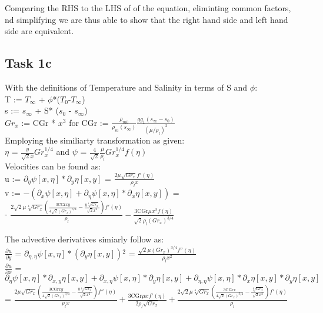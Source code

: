 \documentclass[letterpaper, 10pt]{article}
\begin{document}
	Comparing the RHS to the LHS of of the equation, eliminting common factors, nd simplifying we are thus able to show that the right hand side and left hand side are equivalent.

	\subsection*{Task 1c} %
	\label{ssec:Task 1b}
	With the definitions of Temperature and Salinity in terms of S and $\phi$:\\
	T := $T_\infty$ + $\phi$*($T_0$-$T_\infty$)\\
	s := $s_\infty $ + S* ($s_0$ - $s_\infty $)\\
	$Gr_x$ := CGr * $x^3$ for CGr := $\frac{\rho_{m0}}{\rho_m (s_\infty)}\frac{g g_1 (s_\infty-s_0)}{(\mu/\rho_l)^2}$\\

	\noindent Employing the similiarty transformation as given:\\ 
	$\eta$ = $\frac{y}{\sqrt{2}x} Gr_x^{1/4}$ and $\psi$ = $\frac{4}{\sqrt{2}}\frac{\mu}{\rho_l} Gr_x^{1/4} f(\eta)$\\

	\noindent Velocities can be found as:\\
	u := $\partial_\eta \psi [x,\eta ]*\partial _y\eta [x,y]$ = $\frac{2 \mu  \sqrt{Gr_x} f'(\eta )}{\rho_l x}$\\
	v := $-\left(\partial _x\psi [x,\eta ]+\partial _{\eta }\psi [x,\eta ]*\partial _x\eta [x,y]\right) $ = \\ - $\frac{2 \sqrt{2} \mu  \sqrt[4]{Gr_x} \left(\frac{3 \text{CGr} x y}{4 \sqrt{2} \left(Gr_x\right)^{3/4}}-\frac{y \sqrt[4]{Gr_x}}{\sqrt{2} x^2}\right) f'(\eta )}{\rho_l}-\frac{3 \text{CGr} \mu  x^2 f(\eta )}{\sqrt{2} \rho_l \left(Gr_x\right)^{3/4}}$

	\noindent The advective derivatives simiarly follow as:\\ 
	$\frac{\partial u}{\partial y}$ = $\partial _{\eta ,\eta }\psi [x,\eta ]*\left(\partial _y\eta [x,y]\right){}^2$ = $\frac{\sqrt{2} \mu  \left(Gr_x\right)^{3/4} f''(\eta )}{\rho_l x^2}$\\
	$\frac{\partial u}{\partial x}$ = $\partial _{\eta }\psi [x,\eta ]*\partial _{x,y}\eta [x,y]+\partial _{x,\eta }\psi [x,\eta ]*\partial _y\eta [x,y]+\partial
	_{\eta ,\eta }\psi [x,\eta ]*\partial _x\eta [x,y]*\partial _y\eta [x,y]$ =  $\frac{2 \mu  \sqrt{Gr_x} \left(\frac{3 \text{CGr} x y}{4 \sqrt{2} \left(Gr_x\right)^{3/4}}-\frac{y \sqrt[4]{Gr_x}}{\sqrt{2} x^2}\right) f''(\eta )}{\rho_l x}+\frac{3 \text{CGr} \mu  x f'(\eta )}{2 \rho_l \sqrt{Gr_x}}+\frac{2 \sqrt{2}\mu  \sqrt[4]{Gr_x} \left(\frac{3 \text{CGr} x}{4 \sqrt{2} \left(Gr_x\right)^{3/4}}-\frac{\sqrt[4]{Gr_x}}{\sqrt{2} x^2}\right) f'(\eta )}{\rho_l}$ \\
\end{document}
